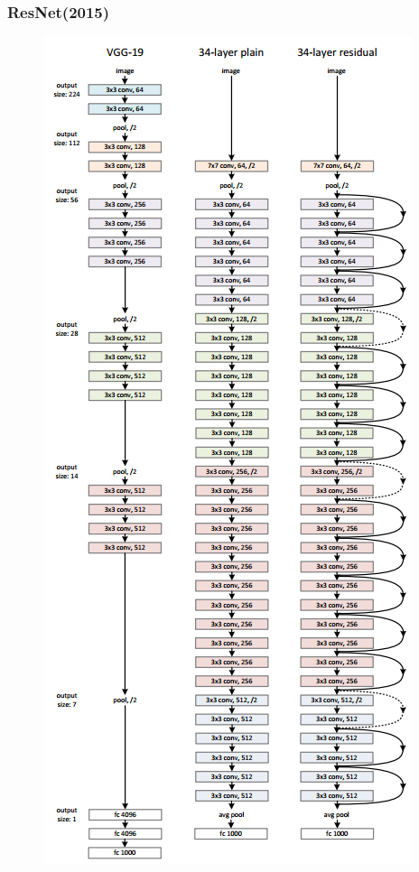 \documentclass[9pt]{beamer}
\begin{document}
\begin{frame}
	\frametitle{ResNet(2015)}
	\begin{minipage}[t]{0.25\textwidth}	
		\begin{figure}[t]
			\includegraphics[scale=0.2]{./figures/edit/resnet_arch.png}
		\end{figure}
	\end{minipage}	
	\begin{minipage}[t]{0.70\textwidth}	

\end{minipage}
\end{frame}
\end{document}
